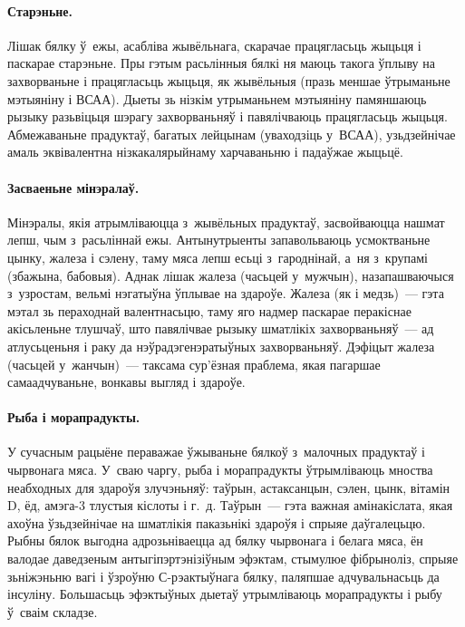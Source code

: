 \paragraph{Старэньне.}
Лішак бялку ў~ежы, асабліва жывёльнага, скарачае працягласьць жыцьця і паскарае старэньне. Пры гэтым расьлінныя бялкі ня маюць такога ўплыву на захворваньне і працягласьць жыцьця, як жывёльныя (празь меншае ўтрыманьне мэтыяніну і ВСАА). Дыеты зь нізкім утрыманьнем мэтыяніну памяншаюць рызыку разьвіцьця шэрагу захворваньняў і павялічваюць працягласьць жыцьця. Абмежаваньне прадуктаў, багатых лейцынам (уваходзіць у~ВСАА), узьдзейнічае амаль эквівалентна нізкакалярыйнаму харчаваньню і падаўжае жыцьцё.

\paragraph{Засваеньне мінэралаў.}
Мінэралы, якія атрымліваюцца з~жывёльных прадуктаў, засвойваюцца нашмат лепш, чым з~расьліннай ежы. Антынутрыенты запавольваюць усмоктваньне цынку, жалеза і сэлену, таму мяса лепш есьці з~гароднінай, а~ня з~крупамі (збажына, бабовыя). Аднак лішак жалеза (часьцей у~мужчын), назапашваючыся з~узростам, вельмі нэгатыўна ўплывае на здароўе. Жалеза (як і медзь)~--- гэта мэтал зь пераходнай валентнасьцю, таму яго надмер паскарае перакіснае акісьленьне тлушчаў, што павялічвае рызыку шматлікіх захворваньняў~--- ад атлусьценьня і раку да нэўрадэгенэратыўных захворваньняў. Дэфіцыт жалеза (часьцей у~жанчын)~--- таксама сур'ёзная праблема, якая пагаршае самаадчуваньне, вонкавы выгляд і здароўе.


\paragraph{Рыба і морапрадукты.}
У сучасным рацыёне пераважае ўжываньне бялкоў з~малочных прадуктаў і чырвонага мяса. У~сваю чаргу, рыба і морапрадукты ўтрымліваюць мноства неабходных для здароўя злучэньняў: таўрын, астаксанцын, сэлен, цынк, вітамін D, ёд, амэга-3 тлустыя кіслоты і г.~д. Таўрын~--- гэта важная амінакіслата, якая ахоўна ўзьдзейнічае на шматлікія паказьнікі здароўя і спрыяе даўгалецьцю. Рыбны бялок выгодна адрозьніваецца ад бялку чырвонага і белага мяса, ён валодае даведзеным антыгіпэртэнізіўным эфэктам, стымулюе фібрыноліз, спрыяе зьніжэньню вагі і ўзроўню С-рэактыўнага бялку, паляпшае адчувальнасьць да інсуліну. Большасьць эфэктыўных дыетаў утрымліваюць морапрадукты і рыбу ў~сваім складзе.

